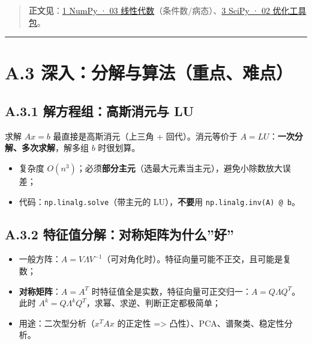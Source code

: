 \begin{quote}
\textbf{正文见}：\href{../../chapters/01-numpy/03-线性代数.md}{1 NumPy ·
03
线性代数}（条件数/病态）、\href{../../chapters/03-scipy/02-优化工具包.md}{3
SciPy · 02 优化工具包}。
\end{quote}

\begin{center}\rule{0.5\linewidth}{0.5pt}\end{center}

\section{A.3
深入：分解与算法（重点、难点）}\label{a.3-ux6df1ux5165ux5206ux89e3ux4e0eux7b97ux6cd5ux91cdux70b9ux96beux70b9}

\subsection{A.3.1 解方程组：高斯消元与
LU}\label{a.3.1-ux89e3ux65b9ux7a0bux7ec4ux9ad8ux65afux6d88ux5143ux4e0e-lu}

求解 \(Ax=b\) 最直接是高斯消元（上三角 + 回代）。消元等价于
\(A=LU\)：\textbf{一次分解、多次求解}，解多组 \(b\) 时很划算。

\begin{itemize}
\tightlist
\item
  复杂度
  \(O(n^3)\)；必须\textbf{部分主元}（选最大元素当主元），避免小除数放大误差；
\item
  代码：\texttt{np.linalg.solve}（带主元的 LU），\textbf{不要}用
  \texttt{np.linalg.inv(A)\ @\ b}。
\end{itemize}

\subsection{A.3.2
特征值分解：对称矩阵为什么''好''}\label{a.3.2-ux7279ux5f81ux503cux5206ux89e3ux5bf9ux79f0ux77e9ux9635ux4e3aux4ec0ux4e48ux597d}

\begin{itemize}
\tightlist
\item
  一般方阵：\(A=V\Lambda V^{-1}\)（可对角化时）。特征向量可能不正交，且可能是复数；
\item
  \textbf{对称矩阵}：\(A=A^T\)
  时特征值全是实数，特征向量可正交归一：\(A=Q\Lambda Q^T\)。此时
  \(A^k=Q\Lambda^k Q^T\)，求幂、求逆、判断正定都极简单；
\item
  用途：二次型分析（\(x^TAx\) 的正定性 =\textgreater{}
  凸性）、PCA、谱聚类、稳定性分析。
\end{itemize}

